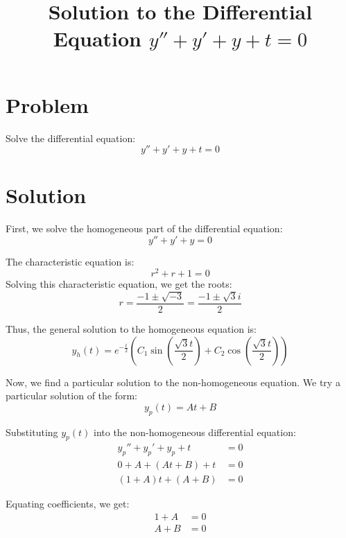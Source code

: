 \documentclass{article}
\begin{document}
\title{Solution to the Differential Equation $y'' + y' + y + t = 0$}
\author{}
\date{}
\maketitle

\section*{Problem}
Solve the differential equation:
\begin{equation}
y'' + y' + y + t = 0
\end{equation}

\section*{Solution}
First, we solve the homogeneous part of the differential equation:
\begin{equation}
y'' + y' + y = 0
\end{equation}

The characteristic equation is:
\begin{equation}
r^2 + r + 1 = 0
\end{equation}
Solving this characteristic equation, we get the roots:
\begin{equation}
r = \frac{-1 \pm \sqrt{-3}}{2} = \frac{-1 \pm \sqrt{3}i}{2}
\end{equation}

Thus, the general solution to the homogeneous equation is:
\begin{equation}
y_h(t) = e^{-\frac{t}{2}} \left( C_1 \sin\left(\frac{\sqrt{3}t}{2}\right) + C_2 \cos\left(\frac{\sqrt{3}t}{2}\right) \right)
\end{equation}

Now, we find a particular solution to the non-homogeneous equation. We try a particular solution of the form:
\begin{equation}
y_p(t) = At + B
\end{equation}

Substituting $y_p(t)$ into the non-homogeneous differential equation:
\begin{align}
y_p'' + y_p' + y_p + t &= 0 \\
0 + A + (At + B) + t &= 0 \\
(1+A)t + (A + B) &= 0
\end{align}

Equating coefficients, we get:
\begin{align}
1 + A &= 0 \\
A + B &= 0
\end{align}
\end{document}
